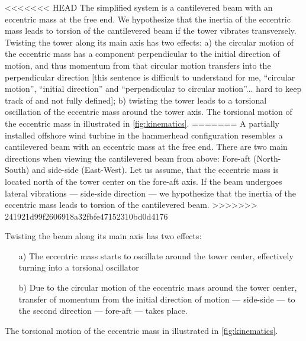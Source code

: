 \documentclass{article}
\begin{document}
<<<<<<< HEAD
The simplified system is a cantilevered beam with an eccentric mass at the free end. We hypothesize that the inertia of the eccentric mass leads to torsion of the cantilevered beam if the tower vibrates transversely. Twisting the tower along its main axis has two effects: a) the circular motion of the eccentric mass has a component perpendicular to the initial direction of motion, and thus momentum from that circular motion transfers into the perpendicular direction [this sentence is difficult to understand for me, ``circular motion'', ``initial direction'' and ``perpendicular to circular motion''... hard to keep track of and not fully defined]; b) twisting the tower leads to a torsional oscillation of the eccentric mass around the tower axis. The torsional motion of the eccentric mass in illustrated in \autoref{fig:kinematics}.
=======
A partially installed offshore wind turbine in the hammerhead configuration resembles a cantilevered beam with an eccentric mass at the free end. There are two main directions when viewing the cantilevered beam from above: Fore-aft (North-South) and side-side (East-West). Let us assume, that the eccentric mass is located north of the tower center on the fore-aft axis. If the beam undergoes lateral vibrations — side-side direction — we hypothesize that the inertia of the eccentric mass leads to torsion of the cantilevered beam.
>>>>>>> 241921d99f2606918a32fbfe47152310bd0d4176

\clearpage

Twisting the beam along its main axis has two effects: 

\begin{itemize}
    \item[a)] The eccentric mass starts to oscillate around the tower center, effectively turning into a torsional oscillator
    
    \item[b)] Due to the circular motion of the eccentric mass around the tower center, transfer of momentum from the initial direction of motion — side-side — to the second direction — fore-aft — takes place.
\end{itemize}

The torsional motion of the eccentric mass in illustrated in \autoref{fig:kinematics}.
\end{document}
